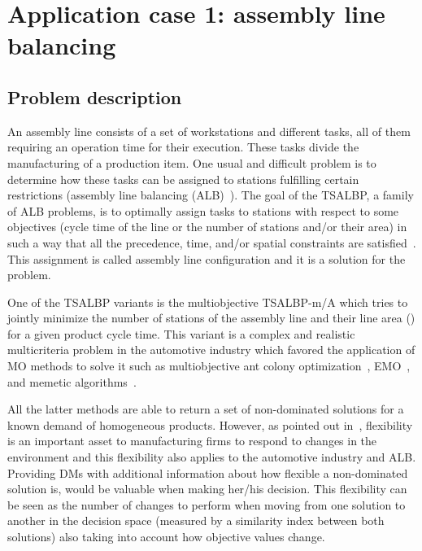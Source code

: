 \documentclass[journal]{IEEEtran}
\begin{document}
\section{Application case 1: assembly line balancing}
\label{sec:appcase1}

\subsection{Problem description}


An assembly line consists of a set of  workstations and  different tasks, all of them requiring an operation time for their execution. These tasks divide the manufacturing of a production item. One usual and difficult problem is to determine how these  tasks can be assigned to  stations fulfilling certain restrictions (assembly line balancing (ALB)~\cite{Battaia13}). The goal of the TSALBP, a family of ALB problems, is to optimally assign tasks to stations with respect to some objectives (cycle time of the line or the number of stations and/or their area) in such a way that all the precedence, time, and/or spatial constraints are satisfied~\cite{Chica10Ins}. This assignment is called assembly line configuration and it is a solution for the problem.

One of the TSALBP variants is the multiobjective TSALBP-m/A which tries to jointly minimize the number of stations  of the assembly line and their line area () for a given product cycle time. This variant is a complex and realistic multicriteria problem in the automotive industry which favored the application of MO methods to solve it such as multiobjective ant colony optimization~\cite{Chica10Ins}, EMO~\cite{Chica11CAIE}, and memetic algorithms~\cite{Chica12EngAppAI}. 

All the latter methods are able to return a set of non-dominated solutions for a known demand of homogeneous products. However, as pointed out in~\cite{Chica13IJPE, Chica16OMEGA}, flexibility is an important asset to manufacturing firms to respond to changes in the environment and this flexibility also applies to the automotive industry and ALB. Providing DMs with additional information about how flexible a non-dominated solution is, would be valuable when making her/his decision. This flexibility can be seen as the number of changes to perform when moving from one solution to another in the decision space (measured by a similarity index between both solutions) also taking into account how  objective values change.
\end{document}
